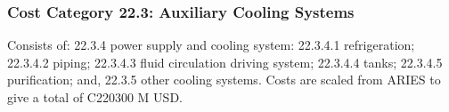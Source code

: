 \subsubsection{Cost Category 22.3: Auxiliary Cooling Systems}

Consists of: 22.3.4 power supply and cooling system: 22.3.4.1 refrigeration; 22.3.4.2 piping; 22.3.4.3 fluid circulation driving system; 22.3.4.4 tanks; 22.3.4.5 purification; and, 22.3.5 other cooling systems. Costs are scaled from ARIES to give a total of C220300 M USD.